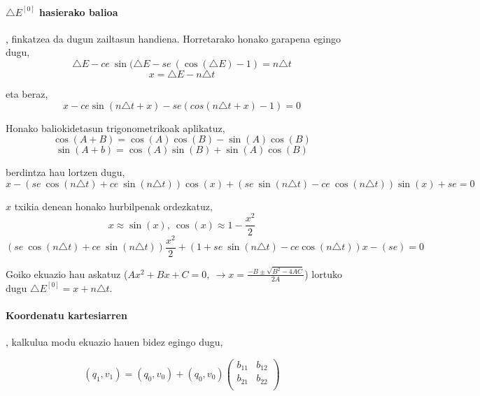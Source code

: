 \paragraph*{\textbf{$\triangle E^{[0]}$ hasierako balioa}}, finkatzea da dugun zailtasun handiena. Horretarako honako garapena egingo dugu,
\begin{equation*}
\triangle E - ce \ \sin(\triangle E- se \ (\cos(\triangle E)-1)=n \triangle t
\end{equation*} 
\begin{equation*}
x=\triangle E- n \triangle t
\end{equation*}

eta beraz,
\begin{equation*}
x-ce \sin(n\triangle t+x)-se(cos(n \triangle t+x)-1)=0
\end{equation*}

Honako baliokidetasun trigonometrikoak aplikatuz,
\begin{equation*}
\cos(A+B)=\cos(A)\cos(B)-\sin(A)\cos(B)
\end{equation*}
\begin{equation*}
\sin(A+b)=\cos(A)\sin(B)+\sin(A)\cos(B)
\end{equation*}

berdintza hau lortzen dugu,
\begin{equation*}
x- (se \ \cos(n \triangle t)+ ce \ \sin(n \triangle t)) \cos(x)+ (se \ \sin(n \triangle t)-ce \ \cos(n \triangle t)) \sin(x)+se =0
\end{equation*}

$x$ txikia denean honako hurbilpenak ordezkatuz,
\begin{equation*}
x \approx \sin(x), \ \cos(x) \approx 1- \frac{x^2}{2}
\end{equation*}
\begin{equation}
(se \ \cos(n \triangle t)+ce \ \sin(n \triangle t)) \frac{x^2}{2}+ (1+se \ \sin(n \triangle t)-ce \cos(n \triangle t))x-(se )=0
\end{equation}

Goiko ekuazio hau askatuz ($Ax^2+Bx+C=0, \ \rightarrow x=\frac{-B\pm \sqrt{B^2-4AC}}{2A}$) lortuko dugu $\triangle E^{[0]}=x+n\triangle t$.

\paragraph*{\textbf{Koordenatu kartesiarren}}, kalkulua modu ekuazio hauen bidez egingo dugu,

\begin{equation*}
(q_1,v_1)=(q_0,v_0)+ (q_0,v_0) \left(\begin{array}{cc}
                                       b_{11} & b_{12} \\
                                       b_{21} & b_{22} \\
                                \end{array}\right)
\end{equation*}

